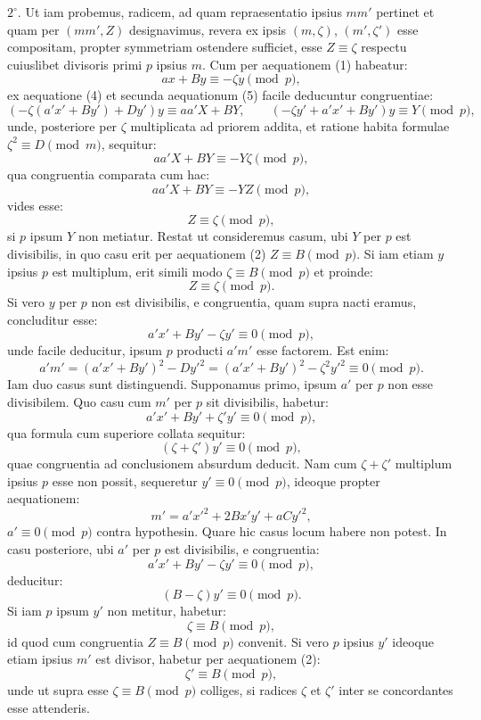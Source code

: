 \documentclass[11pt]{article}
\begin{document}
$2^\circ$. Ut iam probemus, radicem, ad quam repraesentatio ipsius $mm'$ pertinet et quam per $(mm',Z)$ designavimus, revera ex ipsis $(m,\zeta)$, $(m',\zeta')$ esse compositam, propter symmetriam ostendere sufficiet, esse $Z\equiv\zeta$ respectu cuiuslibet divisoris primi $p$ ipsius $m$. Cum per aequationem (1) habeatur:
\[
 ax+By\equiv -\zeta y\pmod p,
\]
ex aequatione (4) et secunda aequationum (5) facile deducuntur congruentiae:
\[
 (-\zeta(a'x'+By')+Dy')y\equiv aa'X+BY,\qquad (-\zeta y'+a'x'+By')y\equiv Y\pmod p,
\]
unde, posteriore per $\zeta$ multiplicata ad priorem addita, et ratione habita formulae $\zeta^2\equiv D\pmod m$, sequitur:
\[
 aa'X+BY\equiv -Y\zeta\pmod p,
\]
qua congruentia comparata cum hac:
\[
 aa'X+BY\equiv -YZ\pmod p,
\]
vides esse:
\[
 Z\equiv\zeta\pmod p,
\]
si $p$ ipsum $Y$ non metiatur. Restat ut consideremus casum, ubi $Y$ per $p$ est divisibilis, in quo casu erit per aequationem (2) $Z\equiv B\pmod p$. Si iam etiam $y$ ipsius $p$ est multiplum, erit simili modo $\zeta\equiv B\pmod p$ et proinde:
\[
 Z\equiv\zeta\pmod p.
\]
Si vero $y$ per $p$ non est divisibilis, e congruentia, quam supra nacti eramus, concluditur esse:
\[
 a'x'+By'-\zeta y'\equiv0\pmod p,
\]
unde facile deducitur, ipsum $p$ producti $a'm'$ esse factorem. Est enim:
\[
 a'm'=(a'x'+By')^2-Dy'^2=(a'x'+By')^2-\zeta^2y'^2\equiv0\pmod p.
\]
Iam duo casus sunt distinguendi. Supponamus primo, ipsum $a'$ per $p$ non esse divisibilem. Quo casu cum $m'$ per $p$ sit divisibilis, habetur:
\[
 a'x'+By'+\zeta'y'\equiv0\pmod p,
\]
qua formula cum superiore collata sequitur:
\[
 (\zeta+\zeta')y'\equiv0\pmod p,
\]
quae congruentia ad conclusionem absurdum deducit. Nam cum $\zeta+\zeta'$ multiplum ipsius $p$ esse non possit, sequeretur $y'\equiv0\pmod p$, ideoque propter aequationem:
\[
 m'=a'x'^2+2Bx'y'+aCy'^2,
\]
$a'\equiv0\pmod p$ contra hypothesin. Quare hic casus locum habere non potest. In casu posteriore, ubi $a'$ per $p$ est divisibilis, e congruentia:
\[
 a'x'+By'-\zeta y'\equiv0\pmod p,
\]
deducitur:
\[
 (B-\zeta)y'\equiv0\pmod p.
\]
Si iam $p$ ipsum $y'$ non metitur, habetur:
\[
 \zeta\equiv B\pmod p,
\]
id quod cum congruentia $Z\equiv B\pmod p$ convenit. Si vero $p$ ipsius $y'$ ideoque etiam ipsius $m'$ est divisor, habetur per aequationem (2):
\[
 \zeta'\equiv B\pmod p,
\]
unde ut supra esse $\zeta\equiv B\pmod p$ colliges, si radices $\zeta$ et $\zeta'$ inter se concordantes esse attenderis.
\end{document}
